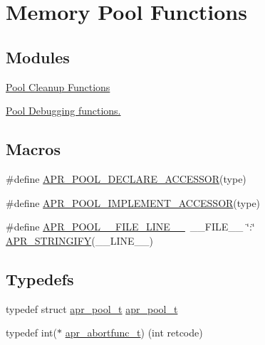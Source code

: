 \hypertarget{group__apr__pools}{}\section{Memory Pool Functions}
\label{group__apr__pools}
\subsection*{Modules}
\begin{DoxyCompactItemize}
\item 
\hyperlink{group___pool_cleanup}{Pool Cleanup Functions}
\item 
\hyperlink{group___pool_debug}{Pool Debugging functions.}
\end{DoxyCompactItemize}
\subsection*{Macros}
\begin{DoxyCompactItemize}
\item 
\#define \hyperlink{group__apr__pools_ga89ce1d55c7f0c39ea87c88eabd655394}{A\+P\+R\+\_\+\+P\+O\+O\+L\+\_\+\+D\+E\+C\+L\+A\+R\+E\+\_\+\+A\+C\+C\+E\+S\+S\+OR}(type)
\item 
\#define \hyperlink{group__apr__pools_ga43a8a52f68f8b7d3b7694c254da4a074}{A\+P\+R\+\_\+\+P\+O\+O\+L\+\_\+\+I\+M\+P\+L\+E\+M\+E\+N\+T\+\_\+\+A\+C\+C\+E\+S\+S\+OR}(type)
\item 
\#define \hyperlink{group__apr__pools_gac81cff34d0ff4be52fa924663478eade}{A\+P\+R\+\_\+\+P\+O\+O\+L\+\_\+\+\_\+\+F\+I\+L\+E\+\_\+\+L\+I\+N\+E\+\_\+\+\_\+}~\+\_\+\+\_\+\+F\+I\+L\+E\+\_\+\+\_\+ \char`\"{}\+:\char`\"{} \hyperlink{apr__version_8h_ae90215615972dfa4108018304361ef0b}{A\+P\+R\+\_\+\+S\+T\+R\+I\+N\+G\+I\+FY}(\+\_\+\+\_\+\+L\+I\+N\+E\+\_\+\+\_\+)
\end{DoxyCompactItemize}
\subsection*{Typedefs}
\begin{DoxyCompactItemize}
\item 
typedef struct \hyperlink{group__apr__pools_gaf137f28edcf9a086cd6bc36c20d7cdfb}{apr\+\_\+pool\+\_\+t} \hyperlink{group__apr__pools_gaf137f28edcf9a086cd6bc36c20d7cdfb}{apr\+\_\+pool\+\_\+t}
\item 
typedef int($\ast$ \hyperlink{group__apr__pools_ga370a939349adf6d1438068e2fc69a0dd}{apr\+\_\+abortfunc\+\_\+t}) (int retcode)
\end{DoxyCompactItemize}
